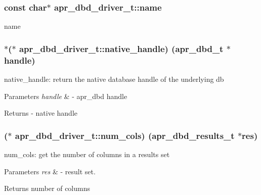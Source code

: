 \subsubsection[{\texorpdfstring{name}{name}}]{\setlength{\rightskip}{0pt plus 5cm}const char$\ast$ apr\+\_\+dbd\+\_\+driver\+\_\+t\+::name}\hypertarget{structapr__dbd__driver__t_a5483b4c47dde6814395bebfb7959fb37}{}\label{structapr__dbd__driver__t_a5483b4c47dde6814395bebfb7959fb37}
name 
\subsubsection[{\texorpdfstring{native\+\_\+handle}{native_handle}}]{$\ast$($\ast$ apr\+\_\+dbd\+\_\+driver\+\_\+t\+::native\+\_\+handle) ({\bf apr\+\_\+dbd\+\_\+t} $\ast${\bf handle})}\hypertarget{structapr__dbd__driver__t_aa26831269f6f2255e39d67dcfc95f3a4}{}\label{structapr__dbd__driver__t_aa26831269f6f2255e39d67dcfc95f3a4}
native\+\_\+handle\+: return the native database handle of the underlying db


\begin{DoxyParams}{Parameters}
{\em handle} & -\/ apr\+\_\+dbd handle \\
\hline
\end{DoxyParams}
\begin{DoxyReturn}{Returns}
-\/ native handle 
\end{DoxyReturn}
\subsubsection[{\texorpdfstring{num\+\_\+cols}{num_cols}}]{($\ast$ apr\+\_\+dbd\+\_\+driver\+\_\+t\+::num\+\_\+cols) ({\bf apr\+\_\+dbd\+\_\+results\+\_\+t} $\ast${\bf res})}\hypertarget{structapr__dbd__driver__t_a518d4b194539fb068ef38ba16d803185}{}\label{structapr__dbd__driver__t_a518d4b194539fb068ef38ba16d803185}
num\+\_\+cols\+: get the number of columns in a results set


\begin{DoxyParams}{Parameters}
{\em res} & -\/ result set. \\
\hline
\end{DoxyParams}
\begin{DoxyReturn}{Returns}
number of columns 
\end{DoxyReturn}
